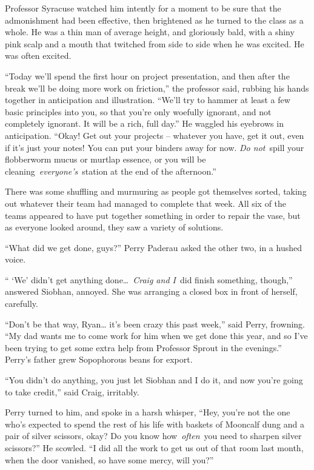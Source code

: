 Professor Syracuse watched him intently for a moment to be sure that the
admonishment had been effective, then brightened as he turned to the
class as a whole. He was a thin man of average height, and gloriously
bald, with a shiny pink scalp and a mouth that twitched from side to
side when he was excited. He was often excited.

``Today we'll spend the first hour on project presentation, and then
after the break we'll be doing more work on friction,'' the professor
said, rubbing his hands together in anticipation and illustration.
``We'll try to hammer at least a few basic principles into you, so that
you're only woefully ignorant, and not completely ignorant. It will be a
rich, full day.'' He waggled his eyebrows in anticipation. ``Okay! Get
out your projects -- whatever you have, get it out, even if it's just
your notes! You can put your binders away for now. \emph{Do not}~spill
your flobberworm mucus or murtlap essence, or you will be
cleaning~\emph{everyone's}~station at the end of the afternoon.''

There was some shuffling and murmuring as people got themselves sorted,
taking out whatever their team had managed to complete that week. All
six of the teams appeared to have put together something in order to
repair the vase, but as everyone looked around, they saw a variety of
solutions.

``What did we get done, guys?'' Perry Paderau asked the other two, in a
hushed voice.

`` `We' didn't get anything done\ldots~\emph{Craig and I}~did finish
something, though,'' answered Siobhan, annoyed. She was arranging a
closed box in front of herself, carefully.

``Don't be that way, Ryan\ldots{} it's been crazy this past week,'' said
Perry, frowning. ``My dad wants me to come work for him when we get done
this year, and so I've been trying to get some extra help from Professor
Sprout in the evenings.'' Perry's father grew Sopophorous beans for
export.

``You didn't do anything, you just let Siobhan and I do it, and now
you're going to take credit,'' said Craig, irritably.

Perry turned to him, and spoke in a harsh whisper, ``Hey, you're not the
one who's expected to spend the rest of his life with baskets of
Mooncalf dung and a pair of silver scissors, okay? Do you know
how~\emph{often}~you need to sharpen silver scissors?'' He scowled. ``I
did all the work to get us out of that room last month, when the door
vanished, so have some mercy, will you?''

